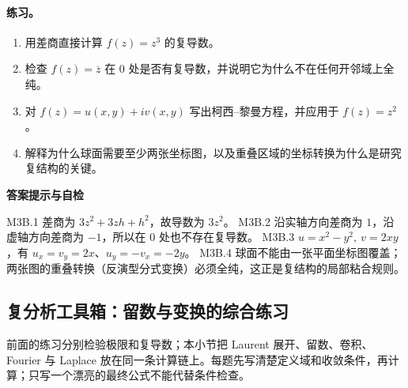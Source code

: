 \documentclass[UTF8,fontset=none,a4paper,11pt]{ctexart}
\theoremstyle{foundation-definition}
\theoremstyle{foundation-theorem}
\theoremstyle{foundation-proposition}
\theoremstyle{foundation-example}
\theoremstyle{foundation-remark}
\theoremstyle{foundation-theorem}
\newenvironment{answerkey}{%
\begin{mdframed}[backgroundcolor=examplebg,linecolor=examplepurple,linewidth=1.0pt,
  leftline=true,rightline=false,topline=false,bottomline=false,
  skipabove=7pt,skipbelow=8pt,innerleftmargin=10pt,innerrightmargin=8pt,
  innertopmargin=6pt,innerbottommargin=6pt]
{\sffamily\bfseries\color{examplepurple}答案提示与自检}\par\smallskip\small
}{\end{mdframed}}
\begin{document}
\paragraph{练习。}
\begin{enumerate}[label=M3B.\arabic*.]
  \item 用差商直接计算 \(f(z)=z^3\) 的复导数。
  \item 检查 \(f(z)=\overline z\) 在 \(0\) 处是否有复导数，并说明它为什么不在任何开邻域上全纯。
  \item 对 \(f(z)=u(x,y)+iv(x,y)\) 写出柯西--黎曼方程，并应用于 \(f(z)=z^2\)。
  \item 解释为什么球面需要至少两张坐标图，以及重叠区域的坐标转换为什么是研究复结构的关键。
\end{enumerate}

\begin{answerkey}
M3B.1 差商为 \(3z^2+3zh+h^2\)，故导数为 \(3z^2\)。
M3B.2 沿实轴方向差商为 \(1\)，沿虚轴方向差商为 \(-1\)，所以在 \(0\) 处也不存在复导数。
M3B.3 \(u=x^2-y^2,\ v=2xy\)，有 \(u_x=v_y=2x\)、\(u_y=-v_x=-2y\)。
M3B.4 球面不能由一张平面坐标图覆盖；两张图的重叠转换（反演型分式变换）必须全纯，这正是复结构的局部粘合规则。
\end{answerkey}

\subsection{复分析工具箱：留数与变换的综合练习}

前面的练习分别检验极限和复导数；本小节把 Laurent 展开、留数、卷积、Fourier 与 Laplace
放在同一条计算链上。每题先写清楚定义域和收敛条件，再计算；只写一个漂亮的最终公式不能代替条件检查。
\end{document}
